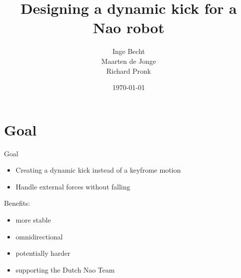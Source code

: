 \documentclass{beamer}
\begin{document}
\title{Designing a dynamic kick for a Nao robot}
\author{Inge Becht \\ Maarten de Jonge \\ Richard Pronk}
\date{\today}


\begin{frame}
  \titlepage
\end{frame}

\section{Goal}
\begin{frame}{Goal}
  \begin{itemize}
    \item Creating a dynamic kick instead of a keyfrome motion
    \item Handle external forces without falling
  \end{itemize}
  \pause
  Benefits:
  \begin{itemize}
    \item more stable
    \item omnidirectional
    \item potentially harder
    \item supporting the Dutch Nao Team
  \end{itemize}
\end{frame}
\end{document}
